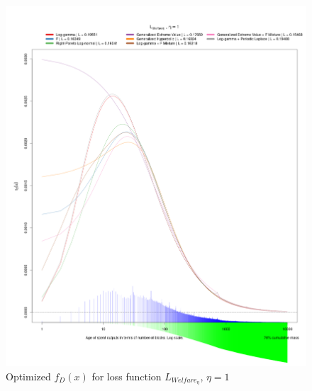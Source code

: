 \documentclass[english]{article}
\begin{document}
\begin{figure}
\caption{Optimized $f_{D}(x)$ for loss function $L_{Welfare_{\eta}}$, $\eta=1$}

\includegraphics[scale=0.35]{images/dry-run/estimate/estimate-L_Welfare-flavor-1}
\end{figure}
\end{document}

